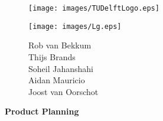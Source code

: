 \documentclass{article}
\begin{document}
\begin{figure}
    \begin{minipage}[H]{0.33\textwidth}
		\vspace{0.3cm}
		\texttt{[image: images/TUDelftLogo.eps]}
	\end{minipage}
	\begin{minipage}[H]{0.33\textwidth}
		\begin{center}
		\end{center}
		
		\begin{center}
			\texttt{[image: images/Lg.eps]}	
		
		\end{center}
	\end{minipage}
	\begin{minipage}[H]{0.33\textwidth}
			\begin{flushright}
				\small{Rob van Bekkum }\\
				\small{Thijs Brands }\\
				\small{Soheil Jahanshahi }\\
				\small{Aidan Mauricio }\\
				\small{Joost van Oorschot }

			\end{flushright}
			
	\end{minipage}
\end{figure}

\begin{minipage}[H]{\textwidth}
\vspace{0.3cm}
		\begin{center}
		
		\vspace{0.3cm}
			\Huge{\textbf{Product Planning}}\\
		\vspace{0.3cm}	
		
		\vspace{0.7cm}	
		\end{center}
\end{minipage}
\end{document}
